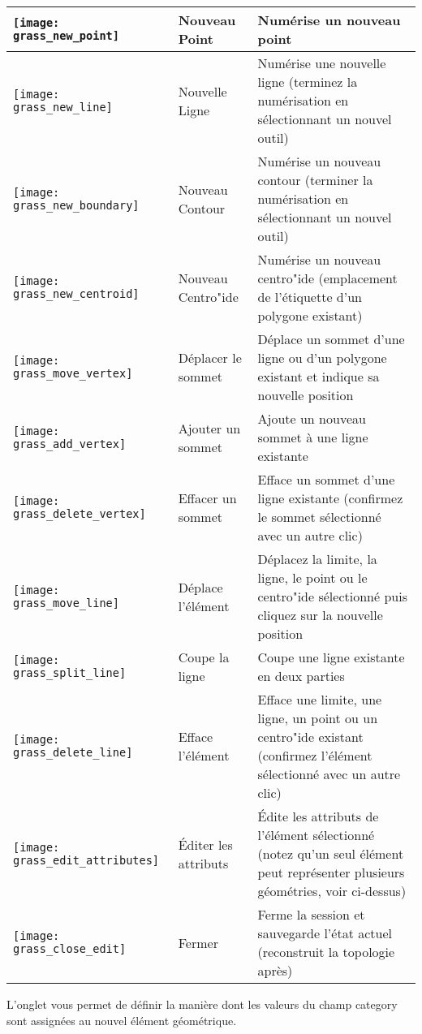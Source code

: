 \begin{table}[h]
\begin{tabular}{|l|l|p{5in}|}
\hline \texttt{[image: grass\_new\_point]} & Nouveau Point & Numérise un nouveau point \\
\hline \texttt{[image: grass\_new\_line]} & Nouvelle Ligne & Numérise une nouvelle ligne (terminez la numérisation en sélectionnant un nouvel outil) \\
\hline \texttt{[image: grass\_new\_boundary]} & Nouveau Contour & Numérise un nouveau contour (terminer la numérisation en sélectionnant un nouvel outil)\\
\hline \texttt{[image: grass\_new\_centroid]} & Nouveau Centro"ide & Numérise un nouveau centro"ide (emplacement de l'étiquette d'un polygone existant)\\
\hline \texttt{[image: grass\_move\_vertex]} & Déplacer le sommet & Déplace un sommet d'une ligne ou d'un polygone existant et indique sa nouvelle position\\
\hline \texttt{[image: grass\_add\_vertex]} & Ajouter un sommet & Ajoute un nouveau sommet à une ligne existante\\
\hline \texttt{[image: grass\_delete\_vertex]} & Effacer un sommet & Efface un sommet d'une ligne existante (confirmez le sommet sélectionné avec un autre clic)\\
\hline \texttt{[image: grass\_move\_line]} & Déplace l'élément & Déplacez la limite, la ligne, le point ou le centro"ide sélectionné puis cliquez sur la nouvelle position\\
\hline \texttt{[image: grass\_split\_line]} & Coupe la ligne & Coupe une ligne existante en deux parties\\
\hline \texttt{[image: grass\_delete\_line]} & Efface l'élément & Efface une limite, une ligne, un point ou un centro"ide existant (confirmez l'élément sélectionné avec un autre clic)\\
\hline \texttt{[image: grass\_edit\_attributes]} & Éditer les attributs & Édite les attributs de l'élément sélectionné (notez qu'un seul élément peut représenter plusieurs géométries, voir ci-dessus)\\
\hline \texttt{[image: grass\_close\_edit]} & Fermer & Ferme la session et sauvegarde l'état actuel (reconstruit la topologie après)\\
\hline
\end{tabular}
\end{table}

L'onglet  vous permet de définir la manière dont les valeurs du champ category sont assignées au nouvel élément géométrique.

